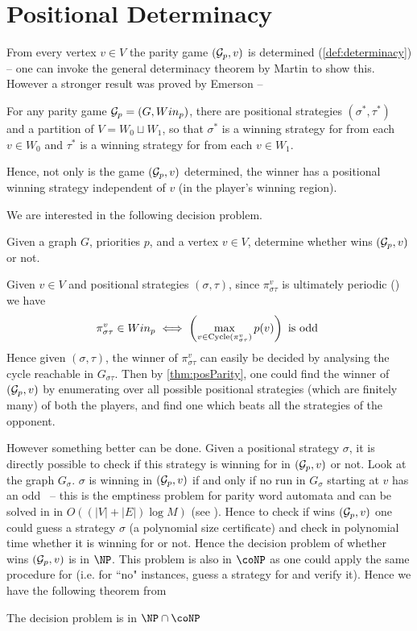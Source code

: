 \section{Positional Determinacy}
From every vertex $v \in V$ the parity game $(\mathcal{G}_p,v)$ is determined (\autoref{def:determinacy}) -- one can invoke the general determinacy theorem by Martin \cite{martin_borel_1975}  to show this. However a stronger result was proved by Emerson \cite{emerson_automata_1985} --


\begin{theorem}
    \label{thm:posParity}
    For any parity game $\mathcal{G}_p=(G,Win_p)$, there are positional strategies $(\sigma^*,\tau^*)$ and a partition of $V = W_0 \sqcup W_1$, so that $\sigma^*$ is a winning strategy for  from each $v \in W_0$ and $\tau^*$ is a winning strategy for  from each $v \in W_1$.
\end{theorem}
Hence, not only is the game $(\mathcal{G}_p,v)$ determined, the winner has a positional winning strategy independent of $v$ (in the player's winning region).

We are interested in the following decision problem.
\begin{decision}[PAR]
    \label{dec:parity}
    Given a graph $G$, priorities $p$, and a vertex $v \in V$, determine whether  wins $(\mathcal{G}_p,v)$ or not.
\end{decision}

Given $v \in V$ and positional strategies $(\sigma,\tau)$, since $\pi^{v}_{\sigma\tau}$ is ultimately periodic () we have
\[
    \pi^{v}_{\sigma\tau} \in Win_p \iff \left( \max_{v \in \operatorname{Cycle}(\pi^v_{\sigma\tau})} p(v)\right) \text{ is odd }
\]
Hence given $(\sigma,\tau)$, the winner of $\pi^v_{\sigma\tau}$ can easily be decided by analysing the cycle reachable in $G_{\sigma\tau}$.  Then by \autoref{thm:posParity}, one could find the winner of $(\mathcal{G}_p,v)$ by enumerating over all possible positional strategies (which are finitely many) of both the players, and find one which beats all the strategies of the opponent.

However something better can be done. Given a positional strategy $\sigma$, it is directly possible to check if this strategy is winning for  in $(\mathcal{G}_p,v)$ or not. Look at the graph $G_\sigma$. $\sigma$ is winning in $(\mathcal{G}_p,v)$ if and only if no run in $G_\sigma$ starting at $v$ has an odd \mip\ -- this is the emptiness problem for parity word automata and can be solved in in $O\left((|V|+|E|) \log M\right)$ (see \cite{king_complexity_2001}). Hence to check if  wins $(\mathcal{G}_p,v)$ one could guess a strategy $\sigma$ (a polynomial size certificate) and check in polynomial time whether it is winning for  or not. Hence the decision problem of whether  wins $(\mathcal{G}_p,v)$ is in $\NP$. This problem is also in $\coNP$ as one could apply the same procedure for  (i.e. for ``no" instances, guess a strategy for  and verify it). Hence we have the following theorem from \cite{thomas2002automata}
\begin{theorem}
    \label{thm:np}
    The decision problem  is in $\NP \cap \coNP$
\end{theorem}

